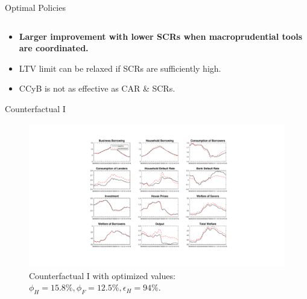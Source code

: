 \documentclass[8pt,aspectratio=169]{beamer}
\numberwithin{equation}{section}
\begin{document}
\begin{frame}{Optimal Policies}
\begin{table}[h]
\begin{tabular}{l|l}
\end{tabular}
\end{table}

\begin{itemize}
\item \textbf{Larger improvement with lower SCRs when macroprudential tools are coordinated.} 
\item {LTV limit can be relaxed if SCRs are sufficiently high. }
\item CCyB is not as effective as CAR \& SCRs. 
\end{itemize}

\end{frame}




\begin{frame}{Counterfactual I}
\begin{figure}[H]
\centering
\caption{Counterfactual I with optimized values: $\phi_H=15.8 \%, \phi_F=12.5 \%, \epsilon_H=94 \%$.}
\includegraphics[scale=0.25]{counterfactuals2.pdf}
\end{figure}
\end{frame}






\end{document}
